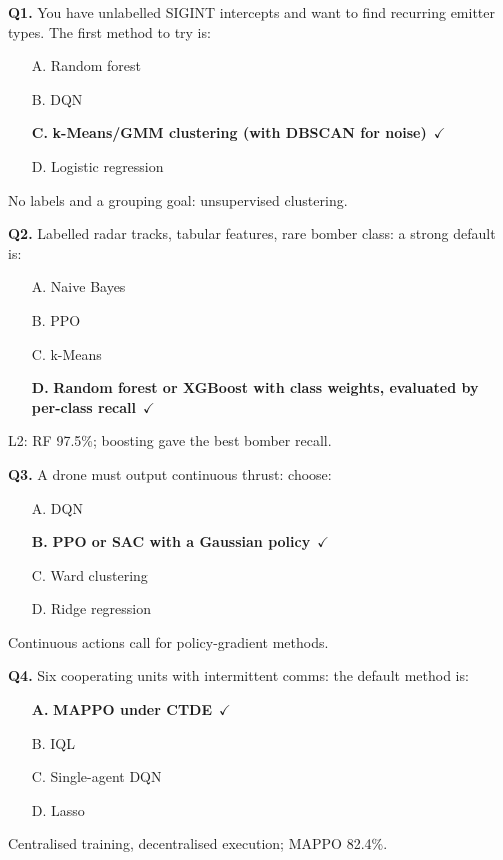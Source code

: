 \documentclass[11pt]{article}
\begin{document}
{\small

\noindent\textbf{Q1.} You have unlabelled SIGINT intercepts and want to find recurring emitter types. The first method to try is:\begin{itemize}[leftmargin=2.2em,itemsep=0pt,topsep=1pt]\item[A.] Random forest\item[B.] DQN\item[\textbf{C.}] \textbf{k-Means/GMM clustering (with DBSCAN for noise)}~{\color{GrnN}$\checkmark$}\item[D.] Logistic regression\end{itemize} No labels and a grouping goal: unsupervised clustering.\par\medskip

\noindent\textbf{Q2.} Labelled radar tracks, tabular features, rare bomber class: a strong default is:\begin{itemize}[leftmargin=2.2em,itemsep=0pt,topsep=1pt]\item[A.] Naive Bayes\item[B.] PPO\item[C.] k-Means\item[\textbf{D.}] \textbf{Random forest or XGBoost with class weights, evaluated by per-class recall}~{\color{GrnN}$\checkmark$}\end{itemize} L2: RF 97.5\%; boosting gave the best bomber recall.\par\medskip

\noindent\textbf{Q3.} A drone must output continuous thrust: choose:\begin{itemize}[leftmargin=2.2em,itemsep=0pt,topsep=1pt]\item[A.] DQN\item[\textbf{B.}] \textbf{PPO or SAC with a Gaussian policy}~{\color{GrnN}$\checkmark$}\item[C.] Ward clustering\item[D.] Ridge regression\end{itemize} Continuous actions call for policy-gradient methods.\par\medskip

\noindent\textbf{Q4.} Six cooperating units with intermittent comms: the default method is:\begin{itemize}[leftmargin=2.2em,itemsep=0pt,topsep=1pt]\item[\textbf{A.}] \textbf{MAPPO under CTDE}~{\color{GrnN}$\checkmark$}\item[B.] IQL\item[C.] Single-agent DQN\item[D.] Lasso\end{itemize} Centralised training, decentralised execution; MAPPO 82.4\%.\par\medskip

}
\end{document}
